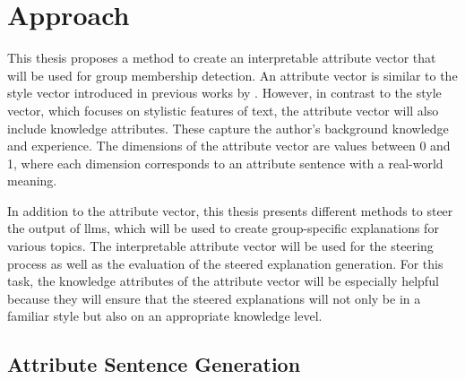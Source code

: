 \chapter{Approach}%
\label{sec:approach}

This thesis proposes a method to create an interpretable attribute vector that will be used for group membership detection. An attribute vector is similar to the style vector introduced in previous works by \citet{konenStyleVectorsSteering2024,wegmannSameAuthorJust2022,patelLearningInterpretableStyle2023,alshomaryLatentSpaceInterpretation2024}. However, in contrast to the style vector, which focuses on stylistic features of text, the attribute vector will also include knowledge attributes. These capture the author's background knowledge and experience. %
The dimensions of the attribute vector are values between \num{0} and \num{1}, where each dimension corresponds to an attribute sentence with a real-world meaning.

In addition to the attribute vector, this thesis presents different methods to steer the output of \acp{llm}, which will be used to create group-specific explanations for various topics. The interpretable attribute vector will be used for the steering process as well as the evaluation of the steered explanation generation. For this task, the knowledge attributes of the attribute vector will be especially helpful because they will ensure that the steered explanations will not only be in a familiar style but also on an appropriate knowledge level.



\section{Attribute Sentence Generation}%
\label{sec:approach:attributeSentenceGeneration}

